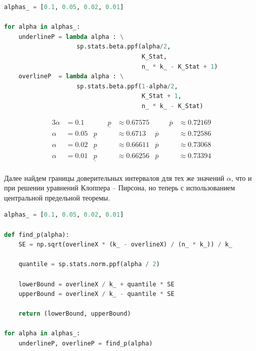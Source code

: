 \documentclass[a4paper, 14pt]{extarticle}
\begin{document}
\begin{center}
    \begin{lstlisting}[language=Python]
alphas_ = [0.1, 0.05, 0.02, 0.01]

for alpha in alphas_:
    underlineP = lambda alpha : \
                    sp.stats.beta.ppf(alpha/2, 
                                      K_Stat, 
                                      n_ * k_ - K_Stat + 1)
    overlineP  = lambda alpha : \
                    sp.stats.beta.ppf(1-alpha/2, 
                                      K_Stat + 1, 
                                      n_ * k_ - K_Stat)
    \end{lstlisting}
\end{center}

\vspace{-10pt}

\begin{alignat*}{3}
    \alpha & = 0.1  & \qquad \underline{p} & \approx 0.67575 & \qquad \overline{p} & \approx 0.72169  \\
    \alpha & = 0.05 &       \underline{p} & \approx 0.6713 &       \overline{p} & \approx 0.72586  \\
    \alpha & = 0.02 &       \underline{p} & \approx 0.66611 &       \overline{p} & \approx 0.73068  \\
    \alpha & = 0.01 &       \underline{p} & \approx 0.66256 &       \overline{p} & \approx 0.73394  \\
\end{alignat*}

Далее найдем границы доверительных интервалов для тех же значений $\alpha$, 
что и при решении уравнений Клоппера – Пирсона, но теперь с использованием 
центральной предельной теоремы.

\begin{center}
    \begin{lstlisting}[language=Python]
alphas_ = [0.1, 0.05, 0.02, 0.01]

def find_p(alpha):
    SE = np.sqrt(overlineX * (k_ - overlineX) / (n_ * k_)) / k_

    quantile = sp.stats.norm.ppf(alpha / 2)

    lowerBound = overlineX / k_ + quantile * SE
    upperBound = overlineX / k_ - quantile * SE

    return (lowerBound, upperBound)

for alpha in alphas_:
    underlineP, overlineP = find_p(alpha)
    \end{lstlisting}
\end{center}
\end{document}

